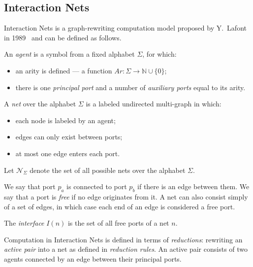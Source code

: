 \subsection{Interaction Nets}\label{sec:interaction_nets}

Interaction Nets is a graph-rewriting computation model proposed by Y.~Lafont in 1989~\cite{10.1145/96709.96718} and can be defined as follows.

\begin{definition}[Agent]
     An \textit{agent} is a symbol from a fixed alphabet $\Sigma$, for which:
\begin{itemize}
    \item an arity is defined --- a function $Ar: \Sigma \to \mathbb{N} \cup \{0\}$;
    \item there is one \textit{principal port} and a number of \textit{auxiliary ports} equal to its arity.
\end{itemize}
\end{definition}

\begin{definition}[Net]
 A \textit{net} over the alphabet $\Sigma$ is a labeled undirected multi-graph in which:
\begin{itemize}
    \item each node is labeled by an agent;
    \item edges can only exist between ports;
    \item at most one edge enters each port.
\end{itemize}
\end{definition}

Let $\mathcal{N}_\Sigma$ denote the set of all possible nets over the alphabet $\Sigma$.

We say that port $p_a$ is connected to port $p_b$ if there is an edge between them.
We say that a port is \textit{free} if no edge originates from it.
A net can also consist simply of a set of edges, in which case each end of an edge is considered a free port.

\begin{definition}[Interface]
The \textit{interface} $I(n)$ is the set of all free ports of a net $n$.
\end{definition}

Computation in Interaction Nets is defined in terms of \textit{reductions}: rewriting an \textit{active pair} into a net as defined in \emph{reduction rules}.
An active pair consists of two agents connected by an edge between their principal ports.

